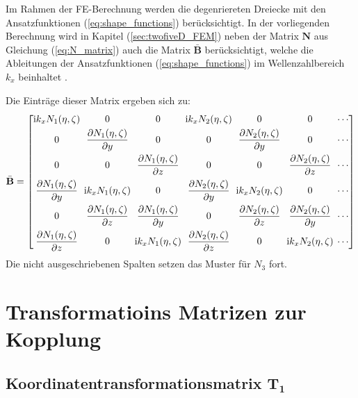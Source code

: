 Im Rahmen der FE-Berechnung werden die degenriereten Dreiecke mit den Ansatzfunktionen (\ref{eq:shape_functions}) berücksichtigt. 
In der vorliegenden Berechnung wird in Kapitel (\ref{sec:twofiveD_FEM}) neben der Matrix \(\mathbf{N}\) aus Gleichung (\ref{eq:N_matrix}) auch die Matrix \(\bar{\mathbf{B}}\) berücksichtigt, welche die Ableitungen der Ansatzfunktionen (\ref{eq:shape_functions}) im Wellenzahlbereich $k_x$ beinhaltet \citep{Hackenberg2016}.

Die Einträge dieser Matrix ergeben sich zu:
\begin{equation}\label{eq:Bbar_tri3}
	\begingroup
	\setlength{\arraycolsep}{2pt} %
	\renewcommand{\arraystretch}{1.1}
	\bar{\mathbf B}=
	\begin{bmatrix}
		\mathrm{i}k_x N_1(\eta,\zeta) & 0 & 0 &
		\mathrm{i}k_x N_2(\eta,\zeta) & 0 & 0 & \cdots\\[3pt]
		0 & \dfrac{\partial N_1(\eta,\zeta)}{\partial y} & 0 &
		0 & \dfrac{\partial N_2(\eta,\zeta)}{\partial y} & 0 & \cdots\\[8pt]
		0 & 0 & \dfrac{\partial N_1(\eta,\zeta)}{\partial z} &
		0 & 0 & \dfrac{\partial N_2(\eta,\zeta)}{\partial z} & \cdots\\[8pt]
		\dfrac{\partial N_1(\eta,\zeta)}{\partial y} & \mathrm{i}k_x N_1(\eta,\zeta) & 0 &
		\dfrac{\partial N_2(\eta,\zeta)}{\partial y} & \mathrm{i}k_x N_2(\eta,\zeta) & 0 & \cdots\\[8pt]
		0 & \dfrac{\partial N_1(\eta,\zeta)}{\partial z} & \dfrac{\partial N_1(\eta,\zeta)}{\partial y} &
		0 & \dfrac{\partial N_2(\eta,\zeta)}{\partial z} & \dfrac{\partial N_2(\eta,\zeta)}{\partial y} & \cdots\\[8pt]
		\dfrac{\partial N_1(\eta,\zeta)}{\partial z} & 0 & \mathrm{i}k_x N_1(\eta,\zeta) &
		\dfrac{\partial N_2(\eta,\zeta)}{\partial z} & 0 & \mathrm{i}k_x N_2(\eta,\zeta) & \cdots
	\end{bmatrix}
	\endgroup
\end{equation}
Die nicht ausgeschriebenen Spalten setzen das Muster für $N_3$ fort.


\section{Transformatioins Matrizen zur Kopplung}
\label{sec:Anhang_Transformationmatrizen}

\subsection{Koordinatentransformationsmatrix $\mathbf{T_1}$}
\label{sec:Koordinatentransformationsmatrix}

